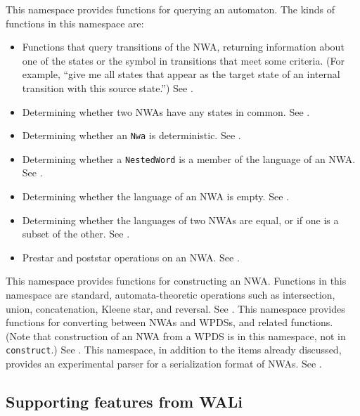 \begin{functionlist}
   This namespace provides functions for
    querying an automaton. The kinds of functions in this namespace are:
    \begin{itemize}
      \item Functions that query transitions of
        the NWA, returning information about one of the states or the symbol
        in transitions that meet some criteria. (For example, ``give me all
        states that appear as the target state of an internal transition with
        this source state.'') See .
      \item Determining whether two NWAs have any states in
        common. See .
      \item Determining whether an \texttt{Nwa} is deterministic. See
        .
      \item Determining whether a \texttt{NestedWord} is a member of the
        language of an NWA. See .
      \item Determining whether the language of an NWA is empty. See
        .
      \item Determining whether the languages of two NWAs are equal, or if
        one is a subset of the other. See .
      \item Prestar and poststar operations on an NWA. See
        .
    \end{itemize}
    
   This namespace provides functions for
    constructing an NWA. Functions in this namespace are standard,
    automata-theoretic operations such as intersection, union, concatenation,
    Kleene star, and reversal. See .
   This namespace provides functions for
    converting between NWAs and WPDSs, and related functions. (Note that
    construction of an NWA from a WPDS is in this namespace, not in
    \texttt{construct}.) See .
   This namespace, in addition to the items already
    discussed, provides an experimental parser for a serialization format of
    NWAs. See .
\end{functionlist}


\subsection{Supporting features from WALi}

